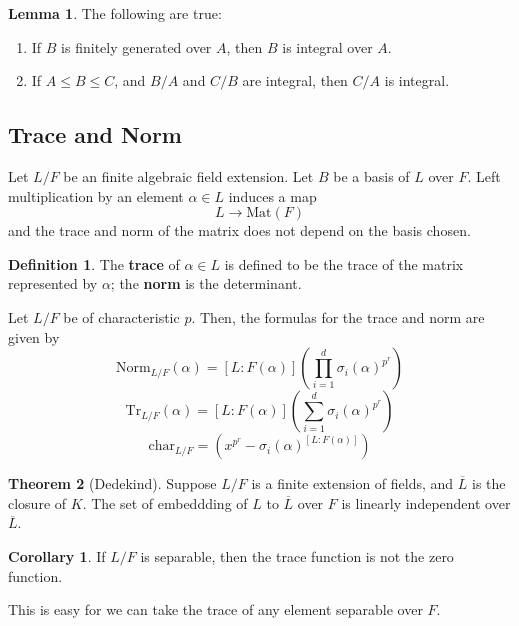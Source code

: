\documentclass{article}
\theoremstyle{definition}
\newtheorem{theorem}{Theorem}[section]
\theoremstyle{definition}
\newtheorem{definition}{Definition}[theorem]
\theoremstyle{definition}
\theoremstyle{definition}
\theoremstyle{definition}
\newtheorem{lemma}[theorem]{Lemma}
\theoremstyle{definition}
\newtheorem{corollary}{Corollary}[theorem]
\theoremstyle{definition}
\begin{document}
\begin{tcolorbox}
\begin{lemma}
The following are true:
\begin{enumerate}
    \item If $B$ is finitely generated over $A$, then $B$ is integral over $A$.
    \item If $A\leq B\leq C$, and $B/A$ and $C/B$ are integral, then $C/A$ is integral. 
\end{enumerate}
\end{lemma}
\end{tcolorbox}

\subsection{Trace and Norm}

Let $L/F$ be an finite algebraic field extension. Let $B$ be a basis of $L$ over $F$. Left multiplication by an element $\alpha\in L$ induces a map 
\[L\to \textrm{Mat}(F)\]
and the trace and norm of the matrix does not depend on the basis chosen. 


\begin{tcolorbox}[colback=purple!5!white,colframe=purple!75!black]
\begin{definition}
The \textbf{trace} of $\alpha\in L$ is defined to be the trace of the matrix represented by $\alpha$; the \textbf{norm} is the determinant. 
\end{definition}
\end{tcolorbox}

Let $L/F$ be of characteristic $p$. Then, the formulas for the trace and norm are given by 
\[\textrm{Norm}_{L/F}(\alpha)=[L: F(\alpha)](\prod^d_{i=1}\sigma_i(\alpha)^{p^r})\]
\[\textrm{Tr}_{L/F}(\alpha)=[L: F(\alpha)](\sum^d_{i=1}\sigma_i(\alpha)^{p^r})\]
\[\textrm{char}_{L/F}=(x^{p^r}-\sigma_i(\alpha)^{[L:F(\alpha)]})\]


\begin{tcolorbox}[colback=red!5!white,colframe=red!30!white]
\begin{theorem}[Dedekind]
Suppose $L/F$ is a finite extension of fields, and $\overline{L}$ is the closure of $K$. The set of embeddding of $L$ to $\overline{L}$ over $F$ is linearly independent over $\overline{L}$. 
\end{theorem}
\end{tcolorbox}


\begin{tcolorbox}[colback=green!5!white,colframe=green!30!white]
\begin{corollary}
If $L/F$ is separable, then the trace function is not the zero function.
\end{corollary}
\end{tcolorbox}
This is easy for we can take the trace of any element separable over $F$. 
\end{document}
